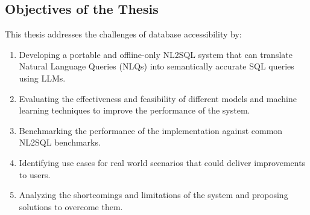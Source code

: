 \subsection{Objectives of the Thesis}\label{section:introduction:objectives}

This thesis addresses the challenges of database accessibility by:

\begin{enumerate}
    \item Developing a portable and offline-only NL2SQL system that can
        translate Natural Language Queries (NLQs) into semantically accurate
        SQL queries using LLMs.
    \item Evaluating the effectiveness and feasibility of different models
        and machine learning techniques to improve the performance of
        the system.
    \item Benchmarking the performance of the implementation against common
        NL2SQL benchmarks.
    \item Identifying use cases for real world scenarios that could
        deliver improvements to users.
    \item Analyzing the shortcomings and limitations of the system and
        proposing solutions to overcome them.
\end{enumerate}
